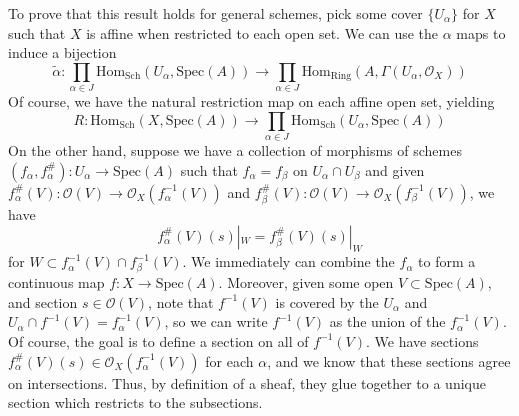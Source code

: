 \documentclass[aps,pra,showpacs,notitlepage,onecolumn,superscriptaddress,nofootinbib]{revtex4-1}
\theoremstyle{definition}
\begin{document}
  To prove that this result holds for general schemes, pick some cover $\{U_{\alpha}\}$ for $X$ such that $X$ is affine when restricted to each open set. We can use the $\alpha$ maps to induce a bijection
  \begin{equation}
    \widetilde{\alpha} : \displaystyle\prod_{\alpha \in J} \text{Hom}_{\text{Sch}}(U_{\alpha}, \text{Spec}(A)) \rightarrow \displaystyle\prod_{\alpha \in J} \text{Hom}_{\text{Ring}}(A, \Gamma(U_{\alpha}, \mathcal{O}_X))
    \end{equation}
  Of course, we have the natural restriction map on each affine open set, yielding
  \begin{equation}
  R : \text{Hom}_{\text{Sch}}(X, \text{Spec}(A)) \rightarrow  \displaystyle\prod_{\alpha \in J} \text{Hom}_{\text{Sch}}(U_{\alpha}, \text{Spec}(A))
  \end{equation}
  On the other hand, suppose we have a collection of morphisms of schemes $(f_{\alpha}, f_{\alpha}^{\#}) : U_{\alpha} \rightarrow \text{Spec}(A)$ such that $f_{\alpha} = f_{\beta}$ on $U_{\alpha} \cap U_{\beta}$ and
  given $f_{\alpha}^{\#}(V) : \mathcal{O}(V) \rightarrow \mathcal{O}_X(f_{\alpha}^{-1}(V))$ and $f_{\beta}^{\#}(V) : \mathcal{O}(V) \rightarrow \mathcal{O}_X(f_{\beta}^{-1}(V))$, we have
  \begin{equation}
    f_{\alpha}^{\#}(V)(s)|_{W} = f_{\beta}^{\#}(V)(s)|_{W}
    \end{equation}
  for $W \subset f_{\alpha}^{-1}(V) \cap f_{\beta}^{-1}(V)$. We immediately can combine the $f_{\alpha}$ to form a continuous map $f : X \rightarrow \text{Spec}(A)$. Moreover, given some open $V \subset \text{Spec}(A)$, and
  section $s \in \mathcal{O}(V)$, note that $f^{-1}(V)$ is covered by the $U_{\alpha}$ and $U_{\alpha} \cap f^{-1}(V) = f_{\alpha}^{-1}(V)$, so we can write $f^{-1}(V)$ as the union of the $f_{\alpha}^{-1}(V)$. Of course,
  the goal is to define a section on all of $f^{-1}(V)$. We have sections $f_{\alpha}^{\#}(V)(s) \in \mathcal{O}_X(f_{\alpha}^{-1}(V))$ for each $\alpha$, and we know that these sections agree on intersections.
  Thus, by definition of a sheaf, they glue together to a unique section which restricts to the subsections.
\end{document}
